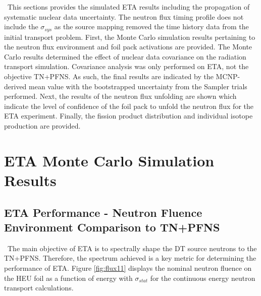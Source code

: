 \ This sections provides the simulated ETA results including the propagation of systematic nuclear data uncertainty. 
The neutron flux timing profile does not include the $\sigma_{sys}$ as the source mapping removed the time history data from the initial transport problem. 
First, the Monte Carlo simulation results pertaining to the neutron flux environment and foil pack activations are provided. 
The Monte Carlo results determined the effect of nuclear data covariance on the radiation transport simulation. 
Covariance analysis was only performed on ETA, not the objective TN+PFNS. 
As such, the final results are indicated by the MCNP-derived mean value with the bootstrapped uncertainty from the Sampler trials performed.
Next, the results of the neutron flux unfolding are shown which indicate the level of confidence of the foil pack to unfold the neutron flux for the ETA experiment. 
Finally, the fission product distribution and individual isotope production are provided. 

\section{ETA Monte Carlo Simulation Results}
\subsection{ETA Performance - Neutron Fluence Environment Comparison to TN+PFNS}

\ The main objective of ETA is to spectrally shape the DT source neutrons to the TN+PFNS.
Therefore, the spectrum achieved is a key metric for determining the performance of ETA.  
Figure \ref{fig:flux11} displays the nominal neutron fluence on the HEU foil as a function of energy with $\sigma_{stat}$ for the continuous energy neutron transport calculations.  
 
